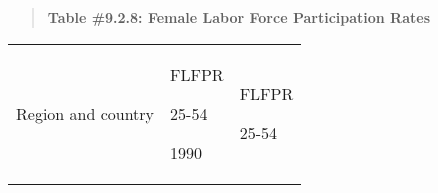 \documentclass[]{book}
\begin{document}
\begin{quote}
\textbf{Table \#9.2.8: Female Labor Force Participation Rates}
\end{quote}

\begin{longtable}[]{@{}lll@{}}
\toprule
\begin{minipage}[b]{0.29\columnwidth}\raggedright
Region and country\strut
\end{minipage} & \begin{minipage}[b]{0.10\columnwidth}\raggedright
FLFPR

25-54

1990\strut
\end{minipage} & \begin{minipage}[b]{0.29\columnwidth}\raggedright
FLFPR

25-54


\end{minipage}
\end{longtable}
\end{document}
